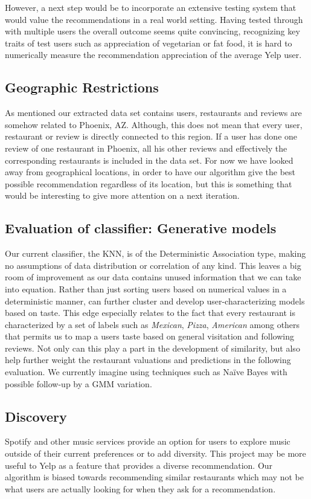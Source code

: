 \documentclass[10pt,twocolumn,letterpaper]{article}
\begin{document}
However, a next step would be to incorporate an extensive testing system that would value the recommendations in a real world setting. Having tested through with multiple users the overall outcome seems quite convincing, recognizing key traits of test users such as appreciation of vegetarian or fat food, it is hard to numerically measure the recommendation appreciation of the average Yelp user.

\subsection{Geographic Restrictions}
As mentioned our extracted data set contains users, restaurants and reviews are somehow related to Phoenix, AZ. Although, this does not mean that every user, restaurant or review is directly connected to this region. If a user has done one review of one restaurant in Phoenix, all his other reviews and effectively the corresponding restaurants is included in the data set. For now we have looked away from geographical locations, in order to have our algorithm give the best possible recommendation regardless of its location, but this is something that would be interesting to give more attention on a next iteration.

\subsection{Evaluation of classifier: Generative models}
Our current classifier, the KNN, is of the Deterministic Association type, making no assumptions of data distribution or correlation of any kind. This leaves a big room of improvement as our data contains unused information that we can take into equation. Rather than just sorting users based on numerical values in a deterministic manner, can further cluster and develop user-characterizing models based on taste. This edge especially relates to the fact that every restaurant is characterized by a set of labels such as \textit{Mexican}, \textit{Pizza}, \textit{American} among others that permits us to map a users taste based on general visitation and following reviews. Not only can this play a part in the development of similarity, but also help further weight the restaurant valuations and predictions in the following evaluation. We currently imagine using techniques such as Naïve Bayes with possible follow-up by a GMM variation.

\subsection{Discovery}
Spotify and other music services provide an option for users to explore music outside of their current preferences or to add diversity. This project may be more useful to Yelp as a feature that provides a diverse recommendation. Our algorithm is biased towards recommending similar restaurants which may not be what users are actually looking for when they ask for a recommendation.


{\small

}
\end{document}
